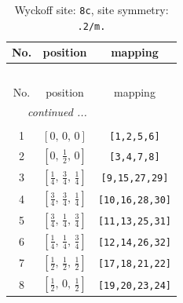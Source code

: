 \documentclass[fleqn,8pt]{jsarticle}
\begin{document}
\renewcommand{\arraystretch}{1.2}
\begin{longtable}{ccc}
\caption{Wyckoff site: {\tt 8c}, site symmetry: {\tt .2/m.}}
 \\
 \hline \hline
No. & position & mapping \\ \hline \endfirsthead

\multicolumn{2}{l}{\tablename\ \thetable{}} \\
 \hline \hline
No. & position & mapping \\ \hline \endhead

 \hline \hline
\multicolumn{2}{r}{\footnotesize\it continued ...} \\ \endfoot

 \hline \hline
\multicolumn{2}{r}{} \\ \endlastfoot

1 & $\left[ 0,\, 0,\, 0 \right]$ & {\tt [1,2,5,6]} \\ \hline
2 & $\left[ 0,\, \frac{1}{2},\, 0 \right]$ & {\tt [3,4,7,8]} \\ \hline
3 & $\left[ \frac{1}{4},\, \frac{3}{4},\, \frac{1}{4} \right]$ & {\tt [9,15,27,29]} \\ \hline
4 & $\left[ \frac{3}{4},\, \frac{3}{4},\, \frac{1}{4} \right]$ & {\tt [10,16,28,30]} \\ \hline
5 & $\left[ \frac{3}{4},\, \frac{1}{4},\, \frac{3}{4} \right]$ & {\tt [11,13,25,31]} \\ \hline
6 & $\left[ \frac{1}{4},\, \frac{1}{4},\, \frac{3}{4} \right]$ & {\tt [12,14,26,32]} \\ \hline
7 & $\left[ \frac{1}{2},\, \frac{1}{2},\, \frac{1}{2} \right]$ & {\tt [17,18,21,22]} \\ \hline
8 & $\left[ \frac{1}{2},\, 0,\, \frac{1}{2} \right]$ & {\tt [19,20,23,24]} \\
\end{longtable}
\renewcommand{\arraystretch}{1.2}
\end{document}
